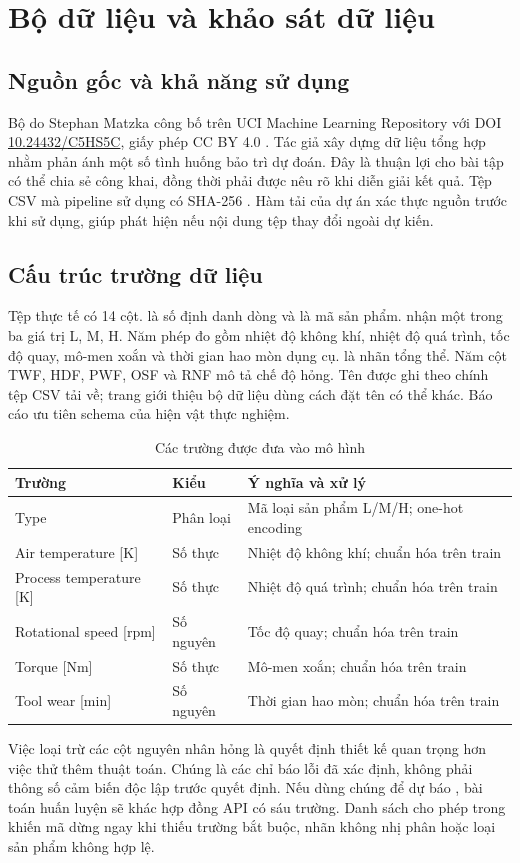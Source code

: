 \chapter{Bộ dữ liệu và khảo sát dữ liệu}
\section{Nguồn gốc và khả năng sử dụng}
Bộ \dataset{} do Stephan Matzka công bố trên UCI Machine Learning Repository với DOI \url{10.24432/C5HS5C}, giấy phép CC BY 4.0 \cite{uci2020,matzka2020}. Tác giả xây dựng dữ liệu tổng hợp nhằm phản ánh một số tình huống bảo trì dự đoán. Đây là thuận lợi cho bài tập có thể chia sẻ công khai, đồng thời phải được nêu rõ khi diễn giải kết quả. Tệp CSV mà pipeline sử dụng có SHA-256 . Hàm tải của dự án xác thực nguồn trước khi sử dụng, giúp phát hiện nếu nội dung tệp thay đổi ngoài dự kiến.

\section{Cấu trúc trường dữ liệu}
Tệp thực tế có 14 cột.  là số định danh dòng và  là mã sản phẩm.  nhận một trong ba giá trị L, M, H. Năm phép đo gồm nhiệt độ không khí, nhiệt độ quá trình, tốc độ quay, mô-men xoắn và thời gian hao mòn dụng cụ.  là nhãn tổng thể. Năm cột TWF, HDF, PWF, OSF và RNF mô tả chế độ hỏng. Tên  được ghi theo chính tệp CSV tải về; trang giới thiệu bộ dữ liệu dùng cách đặt tên có thể khác. Báo cáo ưu tiên schema của hiện vật thực nghiệm.

\begin{table}[H]\centering\caption{Các trường được đưa vào mô hình}\label{tab:features}
\begin{tabularx}{\textwidth}{p{4.8cm}p{2.5cm}X}\toprule
Trường & Kiểu & Ý nghĩa và xử lý\\\midrule
Type & Phân loại & Mã loại sản phẩm L/M/H; one-hot encoding\\
Air temperature [K] & Số thực & Nhiệt độ không khí; chuẩn hóa trên train\\
Process temperature [K] & Số thực & Nhiệt độ quá trình; chuẩn hóa trên train\\
Rotational speed [rpm] & Số nguyên & Tốc độ quay; chuẩn hóa trên train\\
Torque [Nm] & Số thực & Mô-men xoắn; chuẩn hóa trên train\\
Tool wear [min] & Số nguyên & Thời gian hao mòn; chuẩn hóa trên train\\\bottomrule
\end{tabularx}
\end{table}
Việc loại trừ các cột nguyên nhân hỏng là quyết định thiết kế quan trọng hơn việc thử thêm thuật toán. Chúng là các chỉ báo lỗi đã xác định, không phải thông số cảm biến độc lập trước quyết định. Nếu dùng chúng để dự báo , bài toán huấn luyện sẽ khác hợp đồng API có sáu trường. Danh sách cho phép trong  khiến mã dừng ngay khi thiếu trường bắt buộc, nhãn không nhị phân hoặc loại sản phẩm không hợp lệ.

